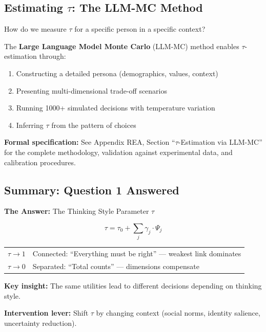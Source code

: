 \subsection{Estimating $\tau$: The LLM-MC Method}
\label{subsec:12-2-estimation}

How do we measure $\tau$ for a specific person in a specific context?

\begin{note}
The \textbf{Large Language Model Monte Carlo} (LLM-MC) method enables 
$\tau$-estimation through:
\begin{enumerate}
\item Constructing a detailed persona (demographics, values, context)
\item Presenting multi-dimensional trade-off scenarios
\item Running 1000+ simulated decisions with temperature variation
\item Inferring $\tau$ from the pattern of choices
\end{enumerate}
\end{note}

\textbf{Formal specification:} See Appendix REA, Section ``$\tau$-Estimation 
via LLM-MC'' for the complete methodology, validation against experimental 
data, and calibration procedures.

\subsection{Summary: Question 1 Answered}
\label{subsec:12-2-summary}

\begin{tcolorbox}[
  colback=blue!3,
  colframe=blue!50!black,
  title={\textbf{Question 1: How Does the Person Think?}},
  fonttitle=\bfseries\sffamily
]

\textbf{The Answer:} The Thinking Style Parameter $\tau$

\begin{equation*}
\tau = \tau_0 + \sum_j \gamma_j \cdot \Psi_j
\end{equation*}

\begin{tabular}{lp{9cm}}
$\tau \to 1$ & Connected: ``Everything must be right'' — weakest link dominates\\
$\tau \to 0$ & Separated: ``Total counts'' — dimensions compensate\\
\end{tabular}

\vspace{6pt}
\textbf{Key insight:} The same utilities lead to different decisions 
depending on thinking style.

\textbf{Intervention lever:} Shift $\tau$ by changing context 
(social norms, identity salience, uncertainty reduction).

\end{tcolorbox}

